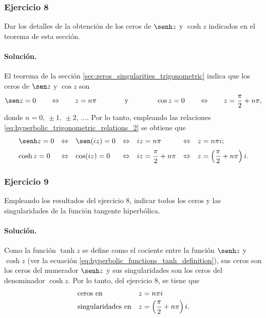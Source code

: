 \documentclass[a4paper]{report}
\begin{document}
\subsubsection{Ejercicio 8}

Dar los detalles de la obtención de los ceros de \(\senh z\) y \(\cosh z\) indicados en el teorema de esta sección.

\paragraph{Solución.} El teorema de la sección \ref{sec:zeros_singularities_trigonometric} indica que los ceros de \(\sen z\) y \(\cos z\) son
\[
 \sen z=0\qquad\Leftrightarrow\qquad z=n\pi
 \qquad\qquad\textrm{y}\qquad\qquad
 \cos z=0\qquad\Leftrightarrow\qquad z=\frac{\pi}{2}+n\pi,
\]
donde \(n=0,\,\pm1,\,\pm2,\,\dots\). Por lo tanto, empleando las relaciones \ref{eq:hyperbolic_trigonometric_relations_2} se obtiene que 
\[
 \begin{array}{lllllll}
  \senh z=0 & \Leftrightarrow & \sen(iz)=0 & \Leftrightarrow & iz=n\pi & \Leftrightarrow & z=n\pi i;\\[\medskipamount]
  \cosh z=0 & \Leftrightarrow & \cos(iz)=0 & \Leftrightarrow & iz=\dfrac{\pi}{2}+n\pi & \Leftrightarrow & z=\left(\dfrac{\pi}{2}+n\pi\right)i.
 \end{array}
\]

\subsubsection{Ejercicio 9}

Empleando los resultados del ejercicio 8, indicar todos los ceros y las singularidades de la función tangente hiperbólica.

\paragraph{Solución.} Como la función \(\tanh z\) se define como el cociente entre la función \(\senh z\) y \(\cosh z\) (ver la ecuación \ref{eq:hyperbolic_functions_tanh_definition}), sus ceros son los ceros del numerador \(\senh z\) y sus singularidades son los ceros del denominador \(\cosh z\). Por lo tanto, del ejercicio 8, se tiene que
\[
 \begin{array}{ll}
  \textrm{ceros en} & z=n\pi i\\[\smallskipamount]
  \textrm{singularidades en} & z=\left(\dfrac{\pi}{2}+n\pi\right)i.
 \end{array}
\]
\end{document}

